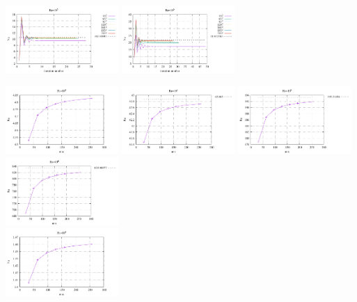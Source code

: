 \begin{center}
\includegraphics[width=4.297cm]{python_codes/fieldstone_155/results_SS/Nu_Ra1e5}
\includegraphics[width=4.297cm]{python_codes/fieldstone_155/results_SS/Nu_Ra1e6}
\end{center}

\begin{center}
\includegraphics[width=4.297cm]{python_codes/fieldstone_155/results_SS/vrms1000}
\includegraphics[width=4.297cm]{python_codes/fieldstone_155/results_SS/vrms10000}
\includegraphics[width=4.297cm]{python_codes/fieldstone_155/results_SS/vrms100000}
\includegraphics[width=4.297cm]{python_codes/fieldstone_155/results_SS/vrms1000000}\\
\includegraphics[width=4.297cm]{python_codes/fieldstone_155/results_SS/Nu1000}

\end{center}
